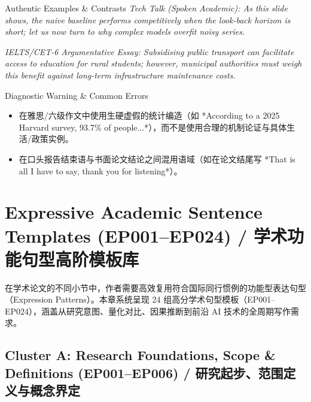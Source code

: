 \begin{ExampleBox}{Authentic Examples \& Contrasts}
\textit{Tech Talk (Spoken Academic): As this slide shows, the naive baseline performs competitively when the look-back horizon is short; let us now turn to why complex models overfit noisy series.}\par\vspace{2pt}
\textit{IELTS/CET-6 Argumentative Essay: Subsidising public transport can facilitate access to education for rural students; however, municipal authorities must weigh this benefit against long-term infrastructure maintenance costs.}\par\vspace{2pt}
\end{ExampleBox}
\begin{TipBox}{Diagnostic Warning \& Common Errors}
\begin{itemize}[leftmargin=1.5em, itemsep=1pt]
  \item 在雅思/六级作文中使用生硬虚假的统计编造（如 *According to a 2025 Harvard survey, 93.7\% of people...*），而不是使用合理的机制论证与具体生活/政策实例。
  \item 在口头报告结束语与书面论文结论之间混用语域（如在论文结尾写 *That is all I have to say, thank you for listening*）。
\end{itemize}
\end{TipBox}
\vspace{6pt}
\chapter{Expressive Academic Sentence Templates (EP001--EP024) / 学术功能句型高阶模板库}\label{ch:templates24}
在学术论文的不同小节中，作者需要高效复用符合国际同行惯例的功能型表达句型（Expression Patterns）。本章系统呈现 24 组高分学术句型模板（EP001--EP024），涵盖从研究意图、量化对比、因果推断到前沿 AI 技术的全周期写作需求。

\section{Cluster A: Research Foundations, Scope \& Definitions (EP001--EP006) / 研究起步、范围定义与概念界定}
